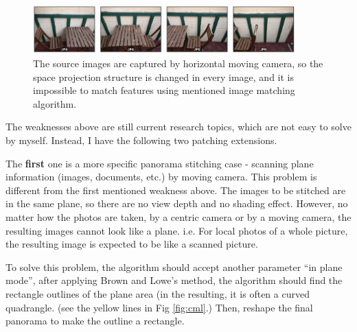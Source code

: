 \documentclass[10pt,twocolumn,letterpaper]{article}
\begin{document}
\begin{figure}
    \begin{center}
        \includegraphics[width=0.9\textwidth]{horizontal_motion}
    \end{center}
    \caption{The source images are captured by horizontal moving camera, so the space projection structure is changed in every image,
    and it is impossible to match features using mentioned image matching algorithm.}
    \label{fig:cameramotion}
\end{figure}

The weaknesses above are still current research topics, which are not easy to solve by myself. Instead, I have the following two patching extensions.

The \textbf{first} one is a more specific panorama stitching case - scanning plane information (images, documents, etc.) by moving camera.
This problem is different from the first mentioned weakness above.
The images to be stitched are in the same plane, so there are no view depth and no shading effect.
However, no matter how the photos are taken, by a centric camera or by a moving camera, the resulting images cannot look like a plane.
i.e. For local photos of a whole picture, the resulting image is expected to be like a scanned picture.

To solve this problem, the algorithm should accept another parameter ``in plane mode'',
after applying Brown and Lowe's method, the algorithm should find the rectangle outlines of the plane area
(in the resulting, it is often a curved quadrangle. (see the yellow lines in Fig \ref{fig:cml}.)
Then, reshape the final panorama to make the outline a rectangle.
\end{document}
